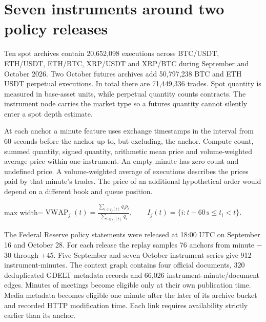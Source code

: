 \documentclass[11pt,oneside,openany]{book}
\begin{document}
\section*{Seven instruments around two policy releases}
Ten spot archives contain 20,652,098 executions across BTC/USDT, ETH/USDT, ETH/BTC, XRP/USDT and XRP/BTC during September and October 2026. Two October futures archives add 50,797,238 BTC and ETH USDT perpetual executions. In total there are 71,449,336 trades. Spot quantity is measured in base-asset units, while perpetual quantity counts contracts. The instrument node carries the market type so a futures quantity cannot silently enter a spot depth estimate.

At each anchor a minute feature uses exchange timestamps in the interval from 60 seconds before the anchor up to, but excluding, the anchor. Compute count, summed quantity, signed quantity, arithmetic mean price and volume-weighted average price within one instrument. An empty minute has zero count and undefined price. A volume-weighted average of executions describes the prices paid by that minute’s trades. The price of an additional hypothetical order would depend on a different book and queue position.

\begin{center}\begin{adjustbox}{max width=\linewidth}$\displaystyle \operatorname{VWAP}_j(t)=\frac{\sum_{i\in I_j(t)}q_i p_i}{\sum_{i\in I_j(t)}q_i},\qquad I_j(t)=\{i:t-60\,\mathrm{s}\le t_i<t\}.$\end{adjustbox}\end{center}
The Federal Reserve policy statements were released at 18:00 UTC on September 16 and October 28. For each release the replay samples 76 anchors from minute \ensuremath{-}30 through +45. Five September and seven October instrument series give 912 instrument-minutes. The context graph contains four official documents, 320 deduplicated GDELT metadata records and 66,026 instrument-minute/document edges. Minutes of meetings become eligible only at their own publication time. Media metadata becomes eligible one minute after the later of its archive bucket and recorded HTTP modification time. Each link requires availability strictly earlier than its anchor.
\end{document}
